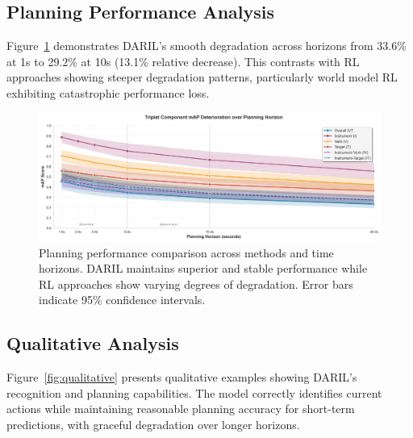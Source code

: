 \documentclass[runningheads]{llncs}
\begin{document}
\subsection{Planning Performance Analysis}

Figure~\ref{fig:planning_analysis} demonstrates DARIL's smooth degradation across horizons from 33.6\% at 1s to 29.2\% at 10s (13.1\% relative decrease). This contrasts with RL approaches showing steeper degradation patterns, particularly world model RL exhibiting catastrophic performance loss.

\begin{figure}[h]
\centering
\includegraphics[width=\textwidth]{planning_analysis_simple.png}
\caption{Planning performance comparison across methods and time horizons. DARIL maintains superior and stable performance while RL approaches show varying degrees of degradation. Error bars indicate 95\% confidence intervals.}
\label{fig:planning_analysis}
\end{figure}

\subsection{Qualitative Analysis}

Figure~\ref{fig:qualitative} presents qualitative examples showing DARIL's recognition and planning capabilities. The model correctly identifies current actions while maintaining reasonable planning accuracy for short-term predictions, with graceful degradation over longer horizons.
\end{document}
